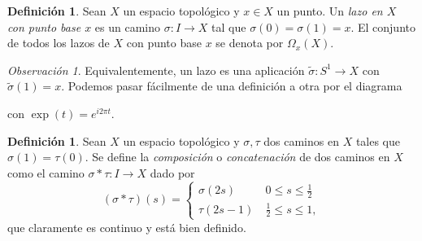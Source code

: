 \documentclass[12pt,a4paper]{book}
\theoremstyle{definition} \newtheorem{defn}[thm]{Definición}
\theoremstyle{definition} \newtheorem{ejemplo}[thm]{Ejemplo}
\theoremstyle{definition} \newtheorem{ejercicio}[thm]{Ejercicio}
\theoremstyle{remark} \newtheorem*{obs}{Observación}
\begin{document}
\begin{defn}
  Sean $X$ un espacio topológico y $x\in X$ un punto. Un \emph{lazo en $X$ con punto base $x$} es un camino $\sigma:I\rightarrow X$ tal que $\sigma(0)=\sigma(1)=x$. El conjunto de todos los lazos de $X$ con punto base $x$ se denota por $\Omega_x(X)$.
\end{defn}
\begin{obs}
  Equivalentemente, un lazo es una aplicación $\tilde\sigma:S^1\rightarrow X$ con $\tilde\sigma(1)=x$. Podemos pasar fácilmente de una definición a otra por el diagrama
      \begin{center}
	con $\exp(t)=e^{i2\pi t}$.
      \end{center}
\end{obs}

\begin{defn}
  Sean $X$ un espacio topológico y $\sigma, \tau$ dos caminos en $X$ tales que $\sigma(1)=\tau(0)$. Se define la \emph{composición} o \emph{concatenación} de dos caminos en $X$ como el camino $\sigma * \tau: I \rightarrow X$ dado por
  \begin{equation*}
    (\sigma * \tau)(s)=
    \begin{cases}
      \sigma(2s) & \ 0\leq s\leq \tfrac{1}{2} \\
      \tau(2s-1) & \ \tfrac{1}{2} \leq s \leq 1,
    \end{cases}
  \end{equation*}
  que claramente es continuo y está bien definido.
\end{defn}
\end{document}
